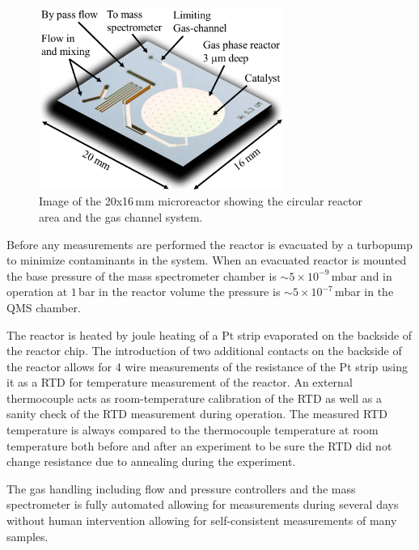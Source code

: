 \documentclass[journal=jacsat,manuscript=article]{achemso}
\begin{document}
\begin{figure}
 \includegraphics[width=8cm]{Ib-reactor.png}
 \caption{Image of the 20x16\,mm microreactor showing the circular reactor area
and the gas channel system.}
  \label{fgr:reactor}
\end{figure}

Before any measurements are performed the reactor is evacuated by a turbopump to minimize
contaminants in the system. When an evacuated reactor is mounted the base
pressure of the mass spectrometer chamber is $\sim5\times10^{-9}\,$mbar and in
operation at $1\,$bar in the reactor volume the pressure is
$\sim5\times10^{-7}\,$mbar in the QMS chamber.

The reactor is heated by joule heating of a Pt strip evaporated on the backside
of the reactor chip. The introduction of two additional contacts on the
backside of the reactor allows for 4 wire measurements of the resistance of the
Pt strip using it as a RTD for temperature measurement of the reactor. An
external thermocouple acts as room-temperature calibration of the RTD as well
as a sanity check of the RTD measurement during operation. The measured RTD
temperature is always compared to the thermocouple temperature at room temperature both
before and after an experiment to be sure the RTD did not change resistance due
to annealing during the experiment.

The gas handling including flow and pressure controllers and the mass
spectrometer is fully automated allowing for measurements during several days
without human intervention allowing for self-consistent measurements of many
samples.
\end{document}
